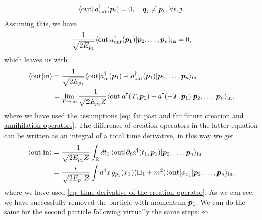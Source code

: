 \begin{equation}
    \bra{\mathrm{out}}a^\dagger_{\mathrm{out}}(\bm{p}_i) = 0,\quad \bm{q}_j \neq \bm{p}_i,\,\forall i,j.
\end{equation}
Assuming this, we have 
\begin{equation}
    \frac{1}{\sqrt{2E_{p_1}}}\langle \mathrm{out} | a^\dagger_{\mathrm{out}}(\bm{p}_1) | \bm{p}_2,\dots,\bm{p}_n \rangle_{\mathrm{in}} = 0,
\end{equation}
which leaves us with 
\begin{equation}
    \begin{split}
        \langle \mathrm{out} | \mathrm{in} \rangle &= \frac{1}{\sqrt{2E_{p_1}}}\langle \mathrm{out} | a^\dagger_{\mathrm{in}}(\bm{p}_1) - a^\dagger_{\mathrm{out}}(\bm{p}_1) | \bm{p}_2,\dots,\bm{p}_n \rangle_{\mathrm{in}} \\
        &= \lim_{T \to \infty}\frac{-1}{\sqrt{2E_{p_1}Z}}\langle \mathrm{out} | a^\dagger(T,\bm{p}_1) - a^\dagger(-T,\bm{p}_1) | \bm{p}_2,\dots,\bm{p}_n \rangle_{\mathrm{in}},
    \end{split}
\end{equation}
where we have used the assumptions \eqref{eq: far past and far future creation and annihilation operators}. The difference of creation operators in the latter equation can be written as an integral of a total time derivative, in this way we get 
\begin{equation}
    \begin{split}
        \langle \mathrm{out} | \mathrm{in} \rangle &= \frac{-1}{\sqrt{2E_{p_1}Z}}\int_{\mathbb{R}} dt_1\,\langle \mathrm{out} | \partial_ta^\dagger(t_1,\bm{p}_1) | \bm{p}_2,\dots,\bm{p}_n \rangle_{\mathrm{in}} \\
        &= \frac{i}{\sqrt{2E_{p_1}Z}}\int d^4x\,g_{p_1}(x_1)(\square_1 + m^2)\langle \mathrm{out} | \phi_{x_1} | \bm{p}_2,\dots,\bm{p}_n \rangle_{\mathrm{in}},
    \end{split}
\end{equation}
where we have used \eqref{eq: time derivative of the creation operator}. As we can see, we have successfully removed the particle with momentum $\bm{p}_1$. We can do the same for the second particle following virtually the same steps: so
